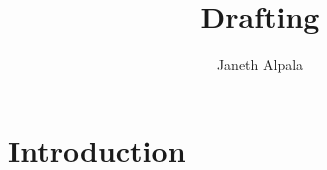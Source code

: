 \documentclass[letterpaper,10pt]{article}
\begin{document}
\title{Drafting}


\author{Janeth Alpala }

\address{  Universidade Federal de Pernambuco\\
}






\section{Introduction}




\end{document}
